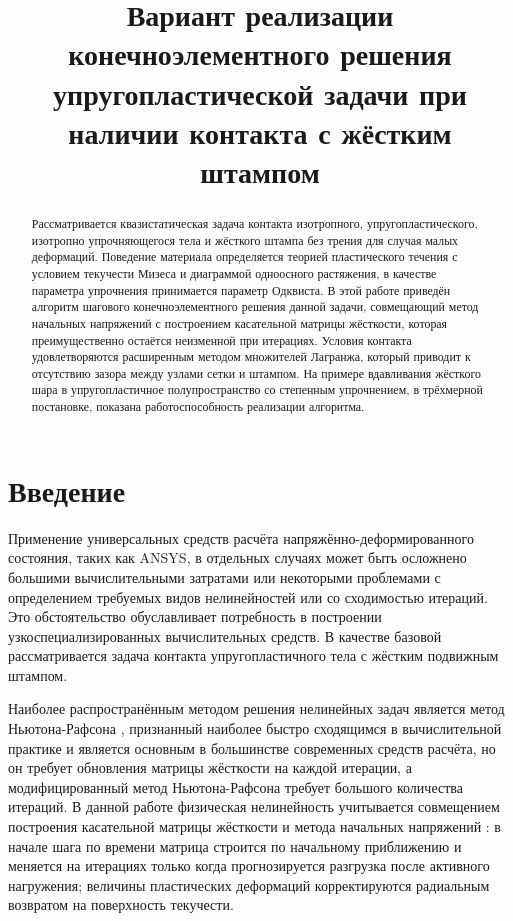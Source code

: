 \documentclass[]{article}
\title{\Large{Вариант реализации конечноэлементного решения упругопластической задачи при наличии контакта с жёстким штампом}}
\author{}
\date{}
\begin{document}
\maketitle
\begin{abstract}
\large{Рассматривается квазистатическая задача контакта изотропного, упругопластического, изотропно упрочняющегося тела и жёсткого штампа без трения для случая малых деформаций. Поведение материала определяется теорией пластического течения с условием текучести Мизеса и диаграммой одноосного растяжения, в качестве параметра упрочнения принимается параметр Одквиста. В этой работе приведён алгоритм шагового конечноэлементного решения данной задачи, совмещающий метод начальных напряжений с построением касательной матрицы жёсткости, которая преимущественно остаётся неизменной при итерациях. Условия контакта удовлетворяются расширенным методом множителей Лагранжа, который приводит к отсутствию зазора между узлами сетки и штампом. На примере вдавливания жёсткого шара в упругопластичное полупространство со степенным упрочнением, в трёхмерной постановке, показана работоспособность реализации алгоритма.}
\end{abstract}

\section{Введение}
Применение универсальных средств расчёта напряжённо-деформированного состояния, таких как ANSYS, в отдельных случаях может быть осложнено большими вычислительными затратами или некоторыми проблемами с определением требуемых видов нелинейностей или со сходимостью итераций. Это обстоятельство обуславливает потребность в построении узкоспециализированных вычислительных средств. В качестве базовой рассматривается задача контакта упругопластичного тела с жёстким подвижным штампом.

Наиболее распространённым методом решения нелинейных задач является метод Ньютона-Рафсона \cite{Bathe1982}, признанный наиболее быстро сходящимся в вычислительной практике и является основным в большинстве современных средств расчёта, но он требует обновления матрицы жёсткости на каждой итерации, а модифицированный метод Ньютона-Рафсона требует большого количества итераций. В данной работе физическая нелинейность учитывается совмещением построения касательной матрицы жёсткости и метода начальных напряжений \cite{Zienkiewicz1975}: в начале шага по времени матрица строится по начальному приближению и меняется на итерациях только когда прогнозируется разгрузка после активного нагружения; величины пластических деформаций корректируются радиальным возвратом на поверхность текучести.
\end{document}
